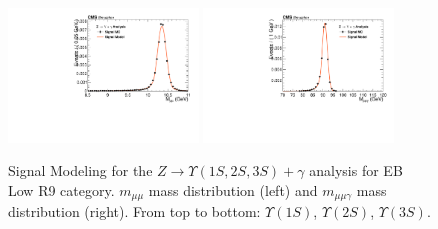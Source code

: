 \begin{figure}[!htbp]
\begin{center}
\includegraphics[width=0.45\textwidth]{figures_and_tables/fitPlotFiles2D/ZToUpsilonPhotonSignalAndBackgroundFit/mMuMNU_ZToUpsilon3SPhotonSignalAndBackgroundFit_Signal_Cat2}\hspace*{1.cm}
\includegraphics[width=0.45\textwidth]{figures_and_tables/fitPlotFiles2D/ZToUpsilonPhotonSignalAndBackgroundFit/mHZ_ZToUpsilon3SPhotonSignalAndBackgroundFit_Signal_Cat2_default}\hspace*{1.cm}


\end{center}\vspace*{-.5cm}
\caption{Signal Modeling for the $Z \rightarrow \Upsilon(1S,2S,3S) +\gamma$ analysis for EB Low R9 category. $m_{\mu\mu}$ mass distribution (left) and $m_{\mu\mu\gamma}$ mass distribution (right). From top to bottom: $\Upsilon(1S)$, $\Upsilon(2S)$, $\Upsilon(3S)$.}
\label{fig:ZToUpsilon_Signal_Cat2}
\end{figure}

